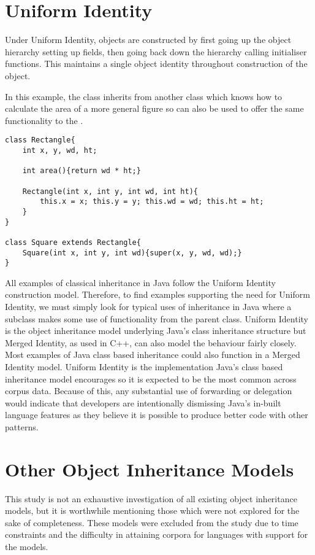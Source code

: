 \section{Uniform Identity}
\label{sec:uniformIdentity}
Under Uniform Identity, objects are constructed by first going up the object hierarchy setting up fields, then going back down the hierarchy calling initialiser functions. This maintains a single object identity throughout construction of the object.
\newline

In this example, the  class inherits from another class which knows how to calculate the area of a more general figure so can also be used to offer the same functionality to the . 
\begin{lstlisting}
class Rectangle{
	int x, y, wd, ht;

	int area(){return wd * ht;}

	Rectangle(int x, int y, int wd, int ht){
		this.x = x; this.y = y; this.wd = wd; this.ht = ht;
	}
}

class Square extends Rectangle{
	Square(int x, int y, int wd){super(x, y, wd, wd);}
}
\end{lstlisting}

All examples of classical inheritance in Java follow the Uniform Identity construction model. Therefore, to find examples supporting the need for Uniform Identity, we must simply look for typical uses of inheritance in Java where a subclass makes some use of functionality from the parent class. Uniform Identity is the object inheritance model underlying Java's class inheritance structure but Merged Identity, as used in C++, can also model the behaviour fairly closely. Most examples of Java class based inheritance could also function in a Merged Identity model. Uniform Identity is the implementation Java's class based inheritance model encourages so it is expected to be the most common across corpus data. Because of this, any substantial use of forwarding or delegation would indicate that developers are intentionally dismissing Java's in-built language features as they believe it is possible to produce better code with other patterns.

\section{Other Object Inheritance Models}
This study is not an exhaustive investigation of all existing object inheritance models, but it is worthwhile mentioning those which were not explored for the sake of completeness. These models were excluded from the study due to time constraints and the difficulty in attaining corpora for languages with support for the models.

